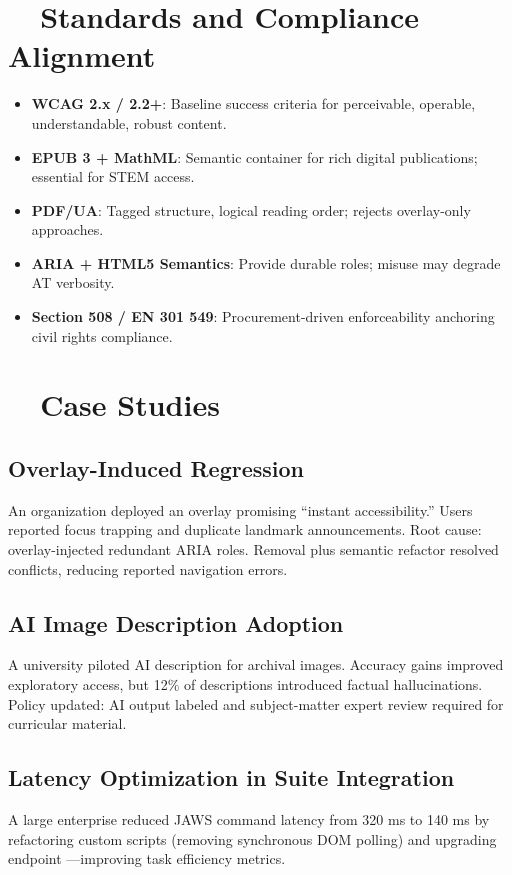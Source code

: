 \section{~~Standards and Compliance Alignment}
\label{sec:ch28-standards}
\begin{itemize}
	\item \textbf{WCAG 2.x / 2.2+}: Baseline success criteria for perceivable, operable, understandable, robust content\supercite{Thatcher2006, Henry2007}.
	\item \textbf{EPUB 3 + MathML}: Semantic container for rich digital publications; essential for STEM access.
	\item \textbf{PDF/UA}: Tagged structure, logical reading order; rejects overlay-only approaches.
	\item \textbf{ARIA + HTML5 Semantics}: Provide durable roles; misuse may degrade AT verbosity.
	\item \textbf{Section 508 / EN 301 549}: Procurement-driven enforceability anchoring civil rights compliance\supercite{Jaeger2006, Lazar2015}.
\end{itemize}

\section{~~Case Studies}
\label{sec:ch28-case-studies}
\subsection*{Overlay-Induced Regression}
An organization deployed an overlay promising “instant accessibility.” Users reported focus trapping and duplicate landmark announcements. Root cause: overlay-injected redundant ARIA roles. Removal plus semantic refactor resolved conflicts, reducing reported navigation errors.

\subsection*{AI Image Description Adoption}
A university piloted AI description for archival images. Accuracy gains improved exploratory access, but 12\% of descriptions introduced factual hallucinations. Policy updated: AI output labeled and subject-matter expert review required for curricular material\supercite{Kim2023}.

\subsection*{Latency Optimization in Suite Integration}
A large enterprise reduced JAWS command latency from 320 ms to 140 ms by refactoring custom scripts (removing synchronous DOM polling) and upgrading endpoint —improving task efficiency metrics\supercite{Smith2022}.

